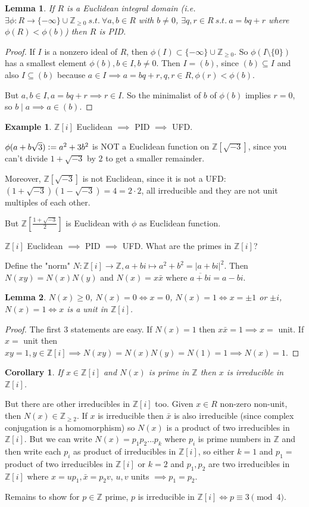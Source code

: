 \documentclass{article}
\newcommand{\Z}{\mathbb{Z}}
\newcommand{\st}{\ s.t.\ }
\newcommand{\defeq}{\vcentcolon=}
\newtheorem*{corollary}{Corollary}
\newtheorem*{lemma}{Lemma}
\theoremstyle{definition}
\newtheorem*{example}{Example}
\theoremstyle{remark}
\begin{document}
\begin{lemma}
    If $R$ is a Euclidean integral domain (i.e. $\exists \phi: R \to \{-\infty\} \cup \Z_{\geq 0} \st \forall a, b \in R$ with $b \neq 0$, $\exists q, r \in R \st a = bq + r$ where $\phi(R) < \phi(b)$) then $R$ is PID.
\end{lemma}
\begin{proof}
    If $I$ is a nonzero ideal of $R$, then $\phi(I) \subset \{-\infty\} \cup \Z_{\geq 0}$. So $\phi(I \setminus \{0\})$ has a smallest element $\phi(b), b \in I, b \neq 0$. Then $I = (b)$, since $(b) \subseteq I$ and also $I \subseteq (b)$ because $a \in I \implies a = bq + r, q, r \in R, \phi(r) < \phi(b)$.

    But $a, b \in I, a = bq + r \implies r \in I$. So the minimalist of $b$ of $\phi(b)$ implies $r = 0$, so $b \mid a \implies a \in (b)$.
\end{proof}
\begin{example}
    $\Z[i]$ Euclidean $\implies$ PID $\implies$ UFD.

    $\phi(a + b \sqrt{3}) \defeq a^2 + 3b^2$ is NOT a Euclidean function on $\Z[\sqrt{-3}]$, since you can't divide $1 + \sqrt{-3}$ by $2$ to get a smaller remainder. 
    
    Moreover, $\Z[\sqrt{-3}]$ is not Euclidean, since it is not a UFD: $(1 + \sqrt{-3})(1 - \sqrt{-3}) = 4 = 2 \cdot 2$, all irreducible and they are not unit multiples of each other. 
\end{example}
But $\Z\left[\frac{1 + \sqrt{-3}}{2}\right]$ is Euclidean with $\phi$ as Euclidean function.

$\Z[i]$ Euclidean $\implies$ PID $\implies$ UFD. What are the primes in $\Z[i]$?

Define the "norm" $N: \Z[i] \to \Z, a + bi \mapsto a^2+b^2 = |a + bi|^2$. Then $N(xy) = N(x)N(y)$ and $N(x) = x \bar{x}$ where $\overline{a + bi} = a - bi$.

\begin{lemma}
    $N(x) \geq 0$, $N(x) = 0 \iff x = 0$, $N(x) = 1 \iff x = \pm 1$ or $\pm i$, $N(x) = 1 \iff x$ is a unit in $\Z[i]$.
\end{lemma}
\begin{proof}
    The first $3$ statements are easy. 
    If $N(x) = 1$ then $x\bar{x} = 1 \implies x = $ unit. If $x = $ unit then $xy = 1, y \in \Z[i] \implies N(xy) = N(x)N(y) = N(1) = 1 \implies N(x) = 1$.
\end{proof}
\begin{corollary}
    If $x \in \Z[i]$ and $N(x)$ is prime in $\Z$ then $x$ is irreducible in $\Z[i]$.
\end{corollary}
But there are other irreducibles in $\Z[i]$ too. Given $x \in R$ non-zero non-unit, then $N(x) \in \Z_{\geq 2}$. If $x$ is irreducible then $\bar{x}$ is also irreducible (since complex conjugation is a homomorphism) so $N(x)$ is a product of two irreducibles in $\Z[i]$. But we can write $N(x) = p_1p_2\ldots p_k$ where $p_i$ is prime numbers in $\Z$ and then write each $p_i$ as product of irreducibles in $\Z[i]$, so either $k = 1$ and $p_1 = $ product of two irreducibles in $\Z[i]$ or $k = 2$ and $p_1, p_2$ are two irreducibles in $\Z[i]$ where $x = up_1, \bar{x} = p_2v$, $u, v$ units $\implies p_1 = p_2$.

Remains to show for $p \in \Z$ prime, $p$ is irreducible in $\Z[i] \iff p \equiv 3 \pmod{4}$.
\end{document}
